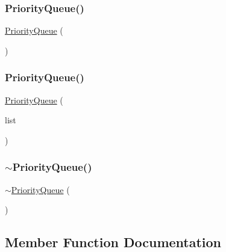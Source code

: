\subsubsection{\texorpdfstring{Priority\+Queue()}{PriorityQueue()}\hspace{0.1cm}{\footnotesize\ttfamily [1/2]}}
{\footnotesize\ttfamily \mbox{\hyperlink{classPriorityQueue}{Priority\+Queue}} (\begin{DoxyParamCaption}{ }\end{DoxyParamCaption})}

\mbox{\label{classPriorityQueue_a3508a0b072e57d2c42cd799a0f89f1f4}} 
\subsubsection{\texorpdfstring{Priority\+Queue()}{PriorityQueue()}\hspace{0.1cm}{\footnotesize\ttfamily [2/2]}}
{\footnotesize\ttfamily \mbox{\hyperlink{classPriorityQueue}{Priority\+Queue}} (\begin{DoxyParamCaption}\item[{std\+::initializer\+\_\+list$<$ std\+::pair$<$ double, Value\+Type $>$ $>$}]{list }\end{DoxyParamCaption})}

\mbox{\label{classPriorityQueue_af97f1420d96fea6165720866508f06a3}} 
\subsubsection{\texorpdfstring{$\sim$\+Priority\+Queue()}{~PriorityQueue()}}
{\footnotesize\ttfamily $\sim$\mbox{\hyperlink{classPriorityQueue}{Priority\+Queue}} (\begin{DoxyParamCaption}{ }\end{DoxyParamCaption})\hspace{0.3cm}{\ttfamily [virtual]}}



\subsection{Member Function Documentation}
\mbox{\label{classPriorityQueue_aa604cec721b985421df5448c531a4482}} 
